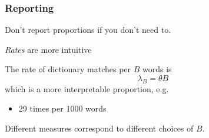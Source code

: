 \documentclass[11pt,compress,professionalfonts]{beamer}
\newcommand{\ita}{\begin{itemize}}
\newcommand{\itm}{\item[]}
\newcommand{\itz}{\end{itemize}}
\begin{document}
\begin{frame}[t,fragile]\frametitle{Reporting}

Don't report proportions if you don't need to.

\textsl{Rates} are more intuitive

The rate of dictionary matches per $B$ words is
\[
\lambda_B = \theta B
\]
which is a more interpretable proportion,
e.g.
\ita
\itm 29 times per 1000 words
\itz
Different measures correspond to different choices of $B$.

%
%
%
%
%
%




\end{frame}
\end{document}

